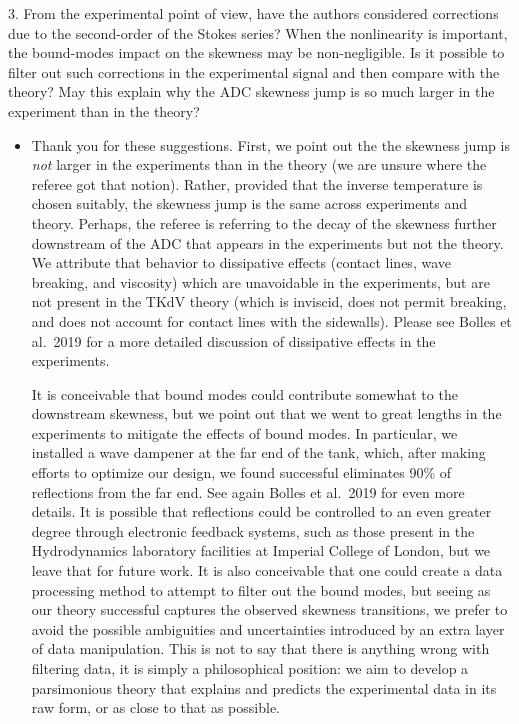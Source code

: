 \documentclass[11pt]{article}
\newcommand{\comment}[1]{{\color{blue} #1}}
\begin{document}
\noindent
\comment{
3. From the experimental point of view, have the authors considered corrections due to the second-order of the Stokes series? When the nonlinearity is important, the bound-modes impact on the skewness may be non-negligible. Is it possible to filter out such corrections in the experimental signal and then compare with the theory? May this explain why the ADC skewness jump is so much larger in the experiment than in the theory?
}
\begin{itemize}
\item Thank you for these suggestions. First, we point out the the skewness jump is {\em not} larger in the experiments than in the theory (we are unsure where the referee got that notion). Rather, provided that the inverse temperature is chosen suitably, the skewness jump is the same across experiments and theory. Perhaps, the referee is referring to the decay of the skewness further downstream of the ADC that appears in the experiments but not the theory. We attribute that behavior to dissipative effects (contact lines, wave breaking, and viscosity) which are unavoidable in the experiments, but are not present in the TKdV theory (which is inviscid, does not permit breaking, and does not account for contact lines with the sidewalls). Please see Bolles et al.~2019 for a more detailed discussion of dissipative effects in the experiments.

It is conceivable that bound modes could contribute somewhat to the downstream skewness, but we point out that we went to great lengths in the experiments to mitigate the effects of bound modes. In particular, we installed a wave dampener at the far end of the tank, which, after making efforts to optimize our design, we found successful eliminates 90\% of reflections from the far end. See again Bolles et al.~2019 for even more details. It is possible that reflections could be controlled to an even greater degree through electronic feedback systems, such as those present in the Hydrodynamics laboratory facilities at Imperial College of London, but we leave that for future work. It is also conceivable that one could create a data processing method to attempt to filter out the bound modes, but seeing as our theory successful captures the observed skewness transitions, we prefer to avoid the possible ambiguities and uncertainties introduced by an extra layer of data manipulation. 
This is not to say that there is anything wrong with filtering data, it is simply a philosophical position: we aim to develop a parsimonious theory that explains and predicts the experimental data in its raw form, or as close to that as possible.
\end{itemize}


\end{document}
